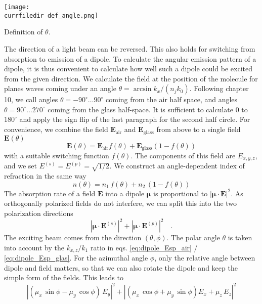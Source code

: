 \begin{marginfigure}
  \texttt{[image: \\currfiledir def\_angle.png]}
  \caption{Definition of $\theta$.}
\end{marginfigure}


The direction of  a light beam can be reversed. This also holds for switching from absorption to emission of a dipole. To calculate the angular emission pattern of a dipole, it is thus convenient to calculate how well such a dipole could be excited from the given direction. We calculate the field at the position of the molecule for planes waves coming under an angle $\theta = \arcsin k_x / (n_j k_0)$. Following \cite{Novotny-Hecht2012} chapter 10, we call angles $\theta = -90^\circ \dots 90^\circ$ coming from the air half space, and angles $\theta = 90^\circ \dots 270^\circ$ coming from the glass half-space. It is sufficient to calculate $0$ to $180^\circ$ and apply the sign flip of the last paragraph for the second half circle. For convenience, we combine the field $\mathbf{E}_\text{air}$ and $\mathbf{E}_\text{glass}$ from above to a single field $\mathbf{E}(\theta)$
\begin{equation}
\mathbf{E}(\theta) = \mathbf{E}_\text{air} f(\theta) + \mathbf{E}_\text{glass} (1 - f(\theta))
\end{equation}
with a suitable switching function $f(\theta)$. The components of this field are $E_{x,y,z}$, and we set $ E^{(s)}= E^{(p)} = \sqrt{1/2}$. We construct an angle-dependent index of refraction in the same way
\begin{equation}
n(\theta) =n_1 \,  f(\theta) + n_2 \, (1 - f(\theta))
\end{equation}
The absorption rate of a field $\mathbf{E}$ into  a dipole $\mathbf{\mu}$ is proportional to $|\mathbf{\mu} \cdot \mathbf{E}|^2$. As orthogonally polarized fields do not interfere, we can split this into the two polarization directions 
\begin{equation}
  \left|\mathbf{\mu} \cdot \mathbf{E}^{(s)} \right|^2
  + \left|\mathbf{\mu} \cdot \mathbf{E}^{(p)} \right|^2 \quad .
\end{equation}
The exciting beam comes from the direction $(\theta, \phi)$. The polar angle $\theta$ is taken into account by the $k_{x,z} / k_1$ ratio in eqs. \ref{eq:dipole_Esp_air} / \ref{eq:dipole_Esp_glas}. For the azimuthal angle $\phi$, only the relative angle between dipole and field matters, so that we can also rotate the dipole and keep the simple form of the fields. This leads to 
\begin{equation}
  \left| ( \mu_x \, \sin \phi  -  \mu_y \, \cos \phi ) \, E_y \right|^2
  + \left| (\mu_x \, \cos \phi  +  \mu_y \, \sin \phi ) E_x + \mu_z \, E_z \right|^2
\end{equation}
